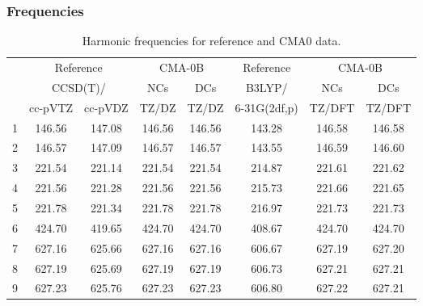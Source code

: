 \documentclass[10pt,oneside]{article}
\begin{document}
\subsubsection*{Frequencies}
\begin{table}[h!]
\centering
\caption{Harmonic frequencies for reference and CMA0 data.}
\begin{tabular}{cccccccc}
\toprule
{} & \multicolumn{2}{c}{Reference} & \multicolumn{2}{c}{CMA-0B} &    Reference & \multicolumn{2}{c}{CMA-0B} \\
{} & \multicolumn{2}{c}{CCSD(T)/} &    NCs &    DCs &       B3LYP/ &    NCs &    DCs \\
{} &   cc-pVTZ & cc-pVDZ &  TZ/DZ &  TZ/DZ & 6-31G(2df,p) & TZ/DFT & TZ/DFT \\
\midrule
1 &    146.56 &  147.08 & 146.56 & 146.56 &       143.28 & 146.58 & 146.58 \\
2 &    146.57 &  147.09 & 146.57 & 146.57 &       143.55 & 146.59 & 146.60 \\
3 &    221.54 &  221.14 & 221.54 & 221.54 &       214.87 & 221.61 & 221.62 \\
4 &    221.56 &  221.28 & 221.56 & 221.56 &       215.73 & 221.66 & 221.65 \\
5 &    221.78 &  221.34 & 221.78 & 221.78 &       216.97 & 221.73 & 221.73 \\
6 &    424.70 &  419.65 & 424.70 & 424.70 &       408.67 & 424.70 & 424.70 \\
7 &    627.16 &  625.66 & 627.16 & 627.16 &       606.67 & 627.19 & 627.20 \\
8 &    627.19 &  625.69 & 627.19 & 627.19 &       606.73 & 627.21 & 627.21 \\
9 &    627.23 &  625.76 & 627.23 & 627.23 &       606.80 & 627.22 & 627.21 \\
\bottomrule
\end{tabular}
\end{table}

\clearpage
\end{document}
